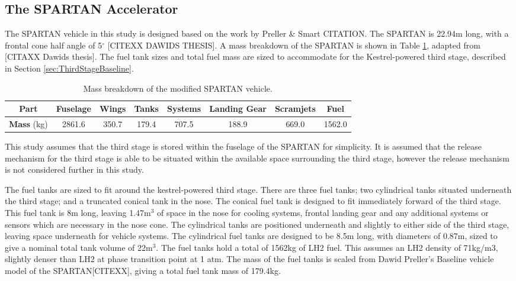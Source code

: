 	
		\subsection{The SPARTAN Accelerator}
		
		The SPARTAN vehicle in this study is designed based on the work by Preller \& Smart CITATION. The SPARTAN is 22.94m long, with a frontal cone half angle of 5$^\circ$ [CITEXX DAWIDS THESIS]. A mass breakdown of the SPARTAN is shown in Table \ref{tab:MassBreakdown}, adapted from [CITAXX Dawids thesis]. The fuel tank sizes and total fuel mass are sized to accommodate for the Kestrel-powered third stage, described in Section \ref{sec:ThirdStageBaseline}.
		\begin{table}[h]
		\begin{tabular}{|c|c|c|c|c|c|c|c|}
			\hline  \textbf{Part} & Fuselage & Wings & Tanks & Systems & Landing Gear & Scramjets & Fuel \\ 
			\hline \textbf{Mass} (kg) & 2861.6 & 350.7 & 179.4 & 707.5 & 188.9 & 669.0 & 1562.0 \\ 
			\hline 
		\end{tabular} 
		\caption{Mass breakdown of the modified SPARTAN vehicle.}
		\label{tab:MassBreakdown}
		\end{table}
This study assumes that the third stage is stored within the fuselage of the SPARTAN for simplicity. It is assumed that the release mechanism for the third stage is able to be situated within the available space surrounding the third stage, however the release mechanism is not considered further in this study. 
		
		

		The fuel tanks are sized to fit around the kestrel-powered third stage. There are three fuel tanks; two cylindrical tanks situated underneath the third stage; and a truncated conical tank in the nose. The conical fuel tank is designed to fit immediately forward of the third stage. This fuel tank is 8m long, leaving 1.47m$^3$ of space in the nose for cooling systems, frontal landing gear and any additional systems or sensors which are necessary in the nose cone. The cylindrical tanks are positioned underneath and slightly to either side of the third stage, leaving space underneath for vehicle systems. The cylindrical fuel tanks are designed to be 8.5m long, with diameters of 0.87m, sized to give a nominal total tank volume of 22m$^3$.
The fuel tanks hold a total of 1562kg of LH2 fuel. This assumes an LH2 density of 71kg/m3, slightly denser than LH2 at phase transition point at 1 atm.
The mass of the fuel tanks is scaled from Dawid Preller's Baseline vehicle model of the SPARTAN[CITEXX], giving a total fuel tank mass of 179.4kg.
		
